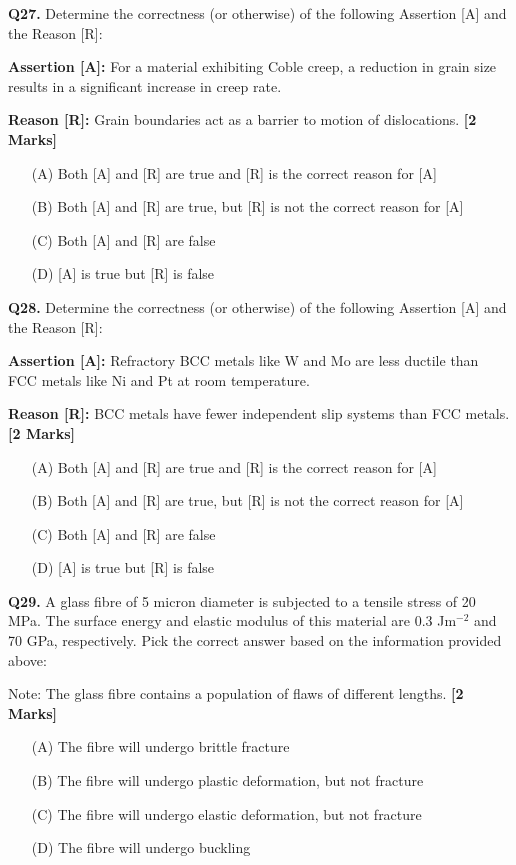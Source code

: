 \documentclass[11pt]{article}
\newcommand{\questionb}[2]{
    \noindent\textbf{Q#2.} #1 \hfill \textbf{[2 Marks]}
}
\begin{document}
\questionb{Determine the correctness (or otherwise) of the following Assertion [A] and the Reason [R]:  

\textbf{Assertion [A]:} For a material exhibiting Coble creep, a reduction in grain size results in a significant increase in creep rate.  

\textbf{Reason [R]:} Grain boundaries act as a barrier to motion of dislocations.}{27}
\begin{enumerate}
    \item[(A)] Both [A] and [R] are true and [R] is the correct reason for [A]  
    \item[(B)] Both [A] and [R] are true, but [R] is not the correct reason for [A]  
    \item[(C)] Both [A] and [R] are false  
    \item[(D)] [A] is true but [R] is false  
\end{enumerate}
\vspace{0.5cm}

\questionb{Determine the correctness (or otherwise) of the following Assertion [A] and the Reason [R]:  

\textbf{Assertion [A]:} Refractory BCC metals like W and Mo are less ductile than FCC metals like Ni and Pt at room temperature.  

\textbf{Reason [R]:} BCC metals have fewer independent slip systems than FCC metals.}{28}
\begin{enumerate}
    \item[(A)] Both [A] and [R] are true and [R] is the correct reason for [A]  
    \item[(B)] Both [A] and [R] are true, but [R] is not the correct reason for [A]  
    \item[(C)] Both [A] and [R] are false  
    \item[(D)] [A] is true but [R] is false  
\end{enumerate}
\vspace{0.5cm}

\questionb{A glass fibre of 5 micron diameter is subjected to a tensile stress of 20 MPa. The surface energy and elastic modulus of this material are 0.3 Jm\(^{-2}\) and 70 GPa, respectively. Pick the correct answer based on the information provided above:  

Note: The glass fibre contains a population of flaws of different lengths.}{29}
\begin{enumerate}
    \item[(A)] The fibre will undergo brittle fracture  
    \item[(B)] The fibre will undergo plastic deformation, but not fracture  
    \item[(C)] The fibre will undergo elastic deformation, but not fracture  
    \item[(D)] The fibre will undergo buckling  
\end{enumerate}
\vspace{0.5cm}
\end{document}
